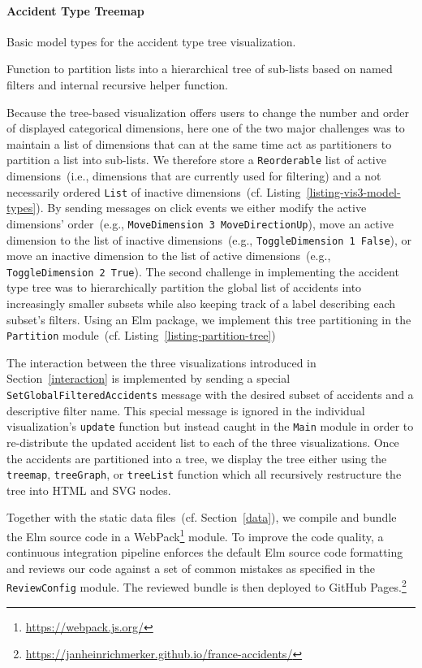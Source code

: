 \paragraph{Accident Type Treemap}
\begin{listing}
    
    \caption{Basic model types for the accident type tree visualization.}
    \label{listing-vis3-model-types}
\end{listing}
\begin{listing}
    
    \caption{Function to partition lists into a hierarchical tree of sub-lists based on named filters and internal recursive helper function.}
    \label{listing-partition-tree}
\end{listing}
Because the tree-based visualization offers users to change the number and order of displayed categorical dimensions, here one of the two major challenges was to maintain a list of dimensions that can at the same time act as partitioners to partition a list into sub-lists.
We therefore store a \lstinline{Reorderable} list of active dimensions~(i.e., dimensions that are currently used for filtering) and a not necessarily ordered \lstinline{List} of inactive dimensions~(cf. Listing~\ref{listing-vis3-model-types}).
By sending messages on click events we either modify the active dimensions' order~(e.g., \lstinline{MoveDimension 3 MoveDirectionUp}), move an active dimension to the list of inactive dimensions~(e.g., \lstinline{ToggleDimension 1 False}), or move an inactive dimension to the list of active dimensions~(e.g., \lstinline{ToggleDimension 2 True}).
The second challenge in implementing the accident type tree was to hierarchically partition the global list of accidents into increasingly smaller subsets while also keeping track of a label describing each subset's filters.
Using an Elm package, we implement this tree partitioning in the \lstinline{Partition} module~(cf. Listing~\ref{listing-partition-tree})

The interaction between the three visualizations introduced in Section~\ref{interaction} is implemented by sending a special \lstinline{SetGlobalFilteredAccidents} message with the desired subset of accidents and a descriptive filter name. This special message is ignored in the individual visualization's \lstinline{update} function but instead caught in the \lstinline{Main} module in order to re-distribute the updated accident list to each of the three visualizations.
Once the accidents are partitioned into a tree, we display the tree either using the \lstinline{treemap}, \lstinline{treeGraph}, or \lstinline{treeList} function which all recursively restructure the tree into HTML and SVG nodes.

Together with the static data files~(cf. Section~\ref{data}), we compile and bundle the Elm source code in a WebPack\footnote{\url{https://webpack.js.org/}} module. To improve the code quality, a continuous integration pipeline enforces the default Elm source code formatting and reviews our code against a set of common mistakes as specified in the \lstinline{ReviewConfig} module.
The reviewed bundle is then deployed to GitHub Pages.\footnote{\url{https://janheinrichmerker.github.io/france-accidents/}}
